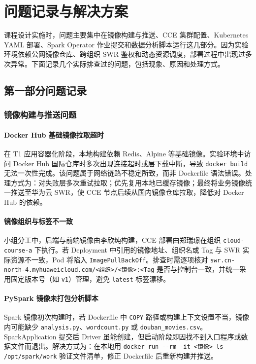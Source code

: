 \section{问题记录与解决方案}

课程设计实施时，问题主要集中在镜像构建与推送、CCE 集群配置、Kubernetes YAML 部署、Spark Operator 作业提交和数据分析脚本运行这几部分。因为实验环境依赖公网镜像仓库、跨组织 SWR 鉴权和动态资源调度，部署过程中出现过多次异常。下面记录几个实际排查过的问题，包括现象、原因和处理方式。

\subsection{第一部分问题记录}

\subsubsection{镜像构建与推送问题}

\paragraph{Docker Hub 基础镜像拉取超时}

在 T1 应用容器化阶段，本地构建依赖 Redis、Alpine 等基础镜像。实验环境中访问 Docker Hub 国际仓库时多次出现连接超时或层下载中断，导致 \verb|docker build| 无法一次性完成。该问题属于网络链路不稳定所致，而非 Dockerfile 语法错误。处理方式为：对失败层多次重试拉取；优先复用本地已缓存镜像；最终将业务镜像统一推送至华为云 SWR，使 CCE 节点后续从国内镜像仓库拉取，降低对 Docker Hub 的依赖。

\paragraph{镜像组织与标签不一致}

小组分工中，后端与前端镜像由李欣纯构建，CCE 部署由郑瑞璟在组织 \verb|cloud-course-a| 下执行。若 Deployment 中引用的镜像地址、组织名或 Tag 与 SWR 实际资源不一致，Pod 将陷入 \verb|ImagePullBackOff|。排查时需逐项核对 \verb|swr.cn-north-4.myhuaweicloud.com/<组织>/<镜像>:<Tag| 是否与控制台一致，并统一采用固定版本号（如 \verb|v1|）管理，避免 \verb|latest| 标签漂移。

\paragraph{PySpark 镜像未打包分析脚本}

Spark 镜像初次构建时，若 Dockerfile 中 \verb|COPY| 路径或构建上下文设置不当，镜像内可能缺少 \verb|analysis.py|、\verb|wordcount.py| 或 \verb|douban_movies.csv|。SparkApplication 提交后 Driver 虽能创建，但启动阶段即因找不到入口程序或数据文件而退出。解决方式为：在本地用 \verb|docker run --rm -it <镜像> ls /opt/spark/work| 验证文件清单，修正 Dockerfile 后重新构建并推送。

